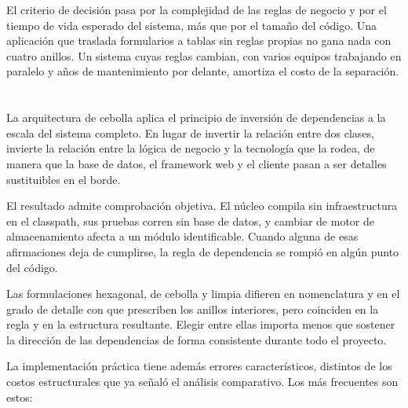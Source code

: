 \documentclass[10pt,a4paper]{article}
\begin{document}
El criterio de decisión pasa por la complejidad de las reglas de negocio y por el tiempo de vida esperado del sistema, más que por el tamaño del código. Una aplicación que traslada formularios a tablas sin reglas propias no gana nada con cuatro anillos. Un sistema cuyas reglas cambian, con varios equipos trabajando en paralelo y años de mantenimiento por delante, amortiza el costo de la separación.

\section{\color{colorIPN}{Conclusión}}

La arquitectura de cebolla aplica el principio de inversión de dependencias a la escala del sistema completo. En lugar de invertir la relación entre dos clases, invierte la relación entre la lógica de negocio y la tecnología que la rodea, de manera que la base de datos, el framework web y el cliente pasan a ser detalles sustituibles en el borde.

El resultado admite comprobación objetiva. El núcleo compila sin infraestructura en el classpath, sus pruebas corren sin base de datos, y cambiar de motor de almacenamiento afecta a un módulo identificable. Cuando alguna de esas afirmaciones deja de cumplirse, la regla de dependencia se rompió en algún punto del código.

Las formulaciones hexagonal, de cebolla y limpia difieren en nomenclatura y en el grado de detalle con que prescriben los anillos interiores, pero coinciden en la regla y en la estructura resultante. Elegir entre ellas importa menos que sostener la dirección de las dependencias de forma consistente durante todo el proyecto.

La implementación práctica tiene además errores característicos, distintos de los costos estructurales que ya señaló el análisis comparativo. Los más frecuentes son estos:
\end{document}
